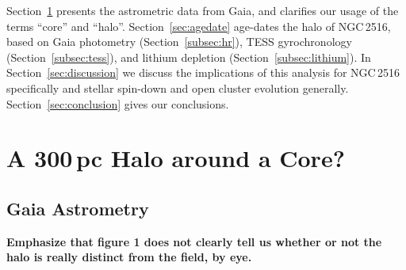 \documentclass[12pt,twocolumn,tighten]{aastex63}
\begin{document}
Section~\ref{sec:gaia} presents the astrometric data from Gaia, and
clarifies our usage of the terms ``core'' and ``halo''.
Section~\ref{sec:agedate} age-dates the halo of NGC\,2516, based on Gaia
photometry (Section~\ref{subsec:hr}), TESS gyrochronology
(Section~\ref{subsec:tess}), and lithium depletion
(Section~\ref{subsec:lithium}).  In Section~\ref{sec:discussion} we
discuss the implications of this analysis for NGC\,2516 specifically and
stellar spin-down and open cluster evolution generally.
Section~\ref{sec:conclusion} gives our conclusions.


\section{A 300\,pc Halo around a Core?}
\label{sec:gaia}
%
%

\subsection{Gaia Astrometry}
\label{subsec:astrometry}

{\bf Emphasize that figure 1 does not clearly tell us whether or not the halo is really distinct from the field, by eye.}
\end{document}
